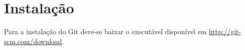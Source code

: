 % 
% 
% 
% 
% 
\chapter{Instala\c{c}\~{a}o}
Para a instala\c{c}\~{a}o do Git deve-se baixar o execut\'{a}vel dispon\'{i}vel em \url{http://git-scm.com/download}.

